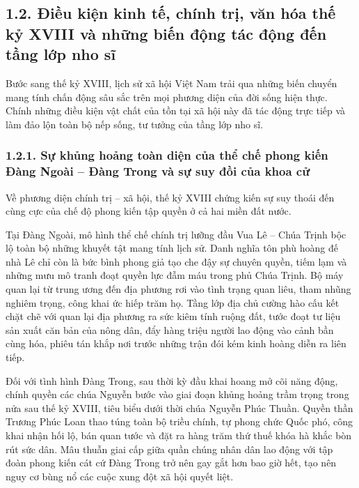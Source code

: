 \subsection*{1.2. Điều kiện kinh tế, chính trị, văn hóa thế kỷ XVIII và những biến động tác động đến tầng lớp nho sĩ}

Bước sang thế kỷ XVIII, lịch sử xã hội Việt Nam trải qua những biến chuyển mang tính chấn động sâu sắc trên mọi phương diện của đời sống hiện thực. Chính những điều kiện vật chất của tồn tại xã hội này đã tác động trực tiếp và làm đảo lộn toàn bộ nếp sống, tư tưởng của tầng lớp nho sĩ.

\subsubsection*{1.2.1. Sự khủng hoảng toàn diện của thể chế phong kiến Đàng Ngoài -- Đàng Trong và sự suy đồi của khoa cử}

Về phương diện chính trị -- xã hội, thế kỷ XVIII chứng kiến sự suy thoái đến cùng cực của chế độ phong kiến tập quyền ở cả hai miền đất nước.

Tại Đàng Ngoài, mô hình thể chế chính trị lưỡng đầu Vua Lê -- Chúa Trịnh bộc lộ toàn bộ những khuyết tật mang tính lịch sử. Danh nghĩa tôn phù hoàng đế nhà Lê chỉ còn là bức bình phong giả tạo che đậy sự chuyên quyền, tiếm lạm và những mưu mô tranh đoạt quyền lực đẫm máu trong phủ Chúa Trịnh. Bộ máy quan lại từ trung ương đến địa phương rơi vào tình trạng quan liêu, tham nhũng nghiêm trọng, công khai ức hiếp trăm họ. Tầng lớp địa chủ cường hào cấu kết chặt chẽ với quan lại địa phương ra sức kiêm tính ruộng đất, tước đoạt tư liệu sản xuất căn bản của nông dân, đẩy hàng triệu người lao động vào cảnh bần cùng hóa, phiêu tán khắp nơi trước những trận đói kém kinh hoàng diễn ra liên tiếp.

Đối với tình hình Đàng Trong, sau thời kỳ đầu khai hoang mở cõi năng động, chính quyền các chúa Nguyễn bước vào giai đoạn khủng hoảng trầm trọng trong nửa sau thế kỷ XVIII, tiêu biểu dưới thời chúa Nguyễn Phúc Thuần. Quyền thần Trương Phúc Loan thao túng toàn bộ triều chính, tự phong chức Quốc phó, công khai nhận hối lộ, bán quan tước và đặt ra hàng trăm thứ thuế khóa hà khắc bòn rút sức dân. Mâu thuẫn giai cấp giữa quần chúng nhân dân lao động với tập đoàn phong kiến cát cứ Đàng Trong trở nên gay gắt hơn bao giờ hết, tạo nên nguy cơ bùng nổ các cuộc xung đột xã hội quyết liệt.

